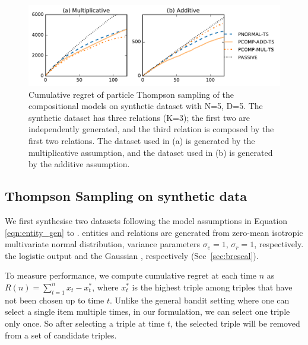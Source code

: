 {\begin{figure}[t]
	\centering
	\includegraphics[width=\linewidth]{images/toy_comp_5_2_5.pdf}
	\caption{\label{fig:comp_synthetic} Cumulative regret of particle Thompson sampling of the compositional models on synthetic dataset with N=5, D=5. The synthetic dataset has three relations (K=3); the first two are independently generated, and the third relation is composed by the first two relations. The dataset used in (a) is generated by the multiplicative assumption, and the dataset used in (b) is generated by the additive assumption.}
\end{figure}

\subsection{Thompson Sampling on synthetic data}

We first synthesise two datasets
following the model assumptions in Equation \ref{eqn:entity_gen} to
\verify{\ref{eqn:triple_gen}}.
entities and relations are generated from zero-mean isotropic multivariate normal distribution, 
variance parameters $\sigma_e=1$, $\sigma_r=1$, respectively.
 the logistic output and the Gaussian , respectively (Sec~\ref{sec:brescal}).

To measure performance, we compute cumulative regret
at each time $n$ as $R(n) = \sum_{t=1}^{n} x_t - x^{*}_t$,
where $x^*_t$ is the highest triple among triples that have not been chosen up to time $t$. Unlike the general
bandit setting where one can select a single item multiple times, in our formulation, we can select one triple
only once. So after selecting a triple at time $t$, the selected triple will be removed from a set of candidate
triples.

}
